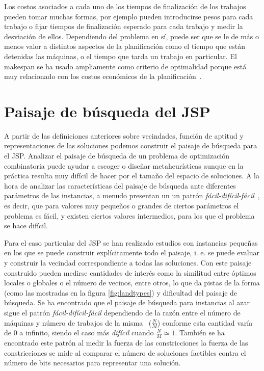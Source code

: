 Los costos asociados a cada uno de los tiempos de finalización de los trabajos pueden tomar muchas formas, por ejemplo pueden introducirse pesos para cada 
trabajo o fijar tiempos de finalización esperado para cada trabajo y medir la desviación de ellos.
%
Dependiendo del problema en sí, puede ser que se le de más o menos valor a distintos aspectos de la planificación como el tiempo que están detenidas las máquinas, 
o el tiempo que tarda un trabajo en particular. 
%
El makespan se ha usado ampliamente como criterio de optimalidad porque está muy relacionado con los costos económicos de la planificación~\cite{Rand1977}.


\section{Paisaje de búsqueda del JSP}

A partir de las definiciones anteriores sobre vecindades, función de aptitud y representaciones de las soluciones podemos construir el paisaje de búsqueda para el JSP.
%
Analizar el paisaje de búsqueda de un problema de optimización combinatoria puede ayudar a escoger o diseñar metaheurísticas aunque en la práctica resulta muy difícil
de hacer por el tamaño del espacio de soluciones. 
%
A la hora de analizar las características del paisaje de búsqueda ante diferentes parámetros de las instancias, a menudo presentan un un patrón 
\textit{fácil-difícil-fácil}~\cite{mammen1997new}, es decir, que para valores muy pequeños o grandes de ciertos parámetros el problema es fácil, y existen ciertos valores
intermedios, para los que el problema se hace difícil.

Para el caso particular del JSP se han realizado estudios con instancias pequeñas en los que se puede construir explícitamente todo el paisaje, i. e. se puede evaluar y 
construir la vecindad correspondiente a todas las soluciones. 
%
Con este paisaje construido pueden medirse cantidades de interés como la similitud entre óptimos locales o globales o el número de vecinos, entre otros, lo que da
pistas de la forma (como las mostradas en la figura \ref{fig:landtypes}) y dificultad del paisaje de búsqueda.
%
Se ha encontrado que el paisaje de búsqueda para instancias al azar sigue el patrón \textit{fácil-difícil-fácil} dependiendo de la razón entre el número de máquinas y 
número de trabajos de la misma~\cite{Streeter2006} ($\frac{N}{M}$) conforme esta cantidad  varía de 0 a infinito, siendo el caso más \textit{difícil} cuando $\frac{N}{M}\simeq 1$. 
%
También se ha encontrado este patrón al medir la fuerza de las constricciones la fuerza de las constricciones se mide al comparar el número de soluciones factibles contra el número de bits necesarios para representar una solución\cite{beck1997constrainedness}.\\

